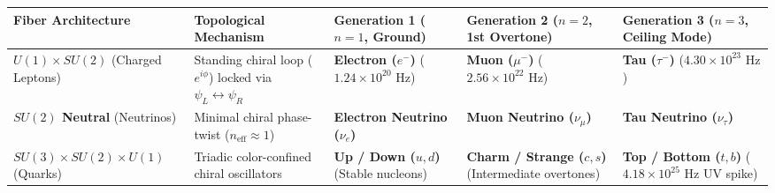 \documentclass[
]{article}
\newcounter{none} %
\begin{document}
{\def\LTcaptype{none} %
\begin{longtable}[]{@{}
  >{\raggedright\arraybackslash}p{}
  >{\raggedright\arraybackslash}p{}
  >{\raggedright\arraybackslash}p{}
  >{\raggedright\arraybackslash}p{}
  >{\raggedright\arraybackslash}p{}@{}}
\toprule\noalign{}
\begin{minipage}[b]{\linewidth}\raggedright
Fiber Architecture
\end{minipage} & \begin{minipage}[b]{\linewidth}\raggedright
Topological Mechanism
\end{minipage} & \begin{minipage}[b]{\linewidth}\raggedright
Generation 1 (\(n = 1\), Ground)
\end{minipage} & \begin{minipage}[b]{\linewidth}\raggedright
Generation 2 (\(n = 2\), 1st Overtone)
\end{minipage} & \begin{minipage}[b]{\linewidth}\raggedright
Generation 3 (\(n = 3\), Ceiling Mode)
\end{minipage} \\
\midrule\noalign{}
\endhead
\bottomrule\noalign{}
\endlastfoot
\textbf{\(U(1) \times SU(2)\)} (Charged Leptons) & Standing chiral loop
(\(e^{i\phi}\)) locked via \(\psi_L \leftrightarrow \psi_R\) &
\textbf{Electron (\(e^-\))} (\(1.24 \times 10^{20}\text{ Hz}\)) &
\textbf{Muon (\(\mu^-\))} (\(2.56 \times 10^{22}\text{ Hz}\)) &
\textbf{Tau (\(\tau^-\))} (\(4.30 \times 10^{23}\text{ Hz}\)) \\
\textbf{\(SU(2)\) Neutral} (Neutrinos) & Minimal chiral phase-twist
(\(n_{\text{eff}} \approx 1\)) & \textbf{Electron Neutrino (\(\nu_e\))}
& \textbf{Muon Neutrino (\(\nu_\mu\))} & \textbf{Tau Neutrino
(\(\nu_\tau\))} \\
\textbf{\(SU(3) \times SU(2) \times U(1)\)} (Quarks) & Triadic
color-confined chiral oscillators & \textbf{Up / Down (\(u, d\))}
(Stable nucleons) & \textbf{Charm / Strange (\(c, s\))} (Intermediate
overtones) & \textbf{Top / Bottom (\(t, b\))}
(\(4.18 \times 10^{25}\text{ Hz}\) UV spike) \\
\end{longtable}
}
\end{document}
